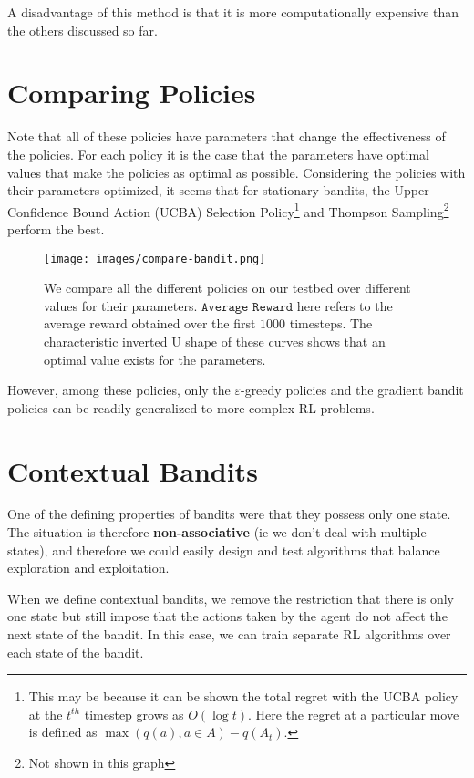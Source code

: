 \documentclass[12pt]{report}
\begin{document}
A disadvantage of this method is that it is more computationally expensive than the others discussed so far.

\section{Comparing Policies}
Note that all of these policies have parameters that change the effectiveness of the policies. For each policy it is the case that the parameters have optimal values that make the policies as optimal as possible.
Considering the policies with their parameters optimized, it seems that for stationary bandits, the Upper Confidence Bound Action (UCBA) Selection Policy\footnote{This may be because it can be shown the total regret with the UCBA policy at the $t^{th}$ timestep grows as $O(\log t)$. Here the regret at a particular move is defined as $\max(q(a), a \in A) - q(A_{t})$.} and Thompson Sampling\footnote{Not shown in this graph} perform the best. 

\begin{figure}[h!]
    \centering
    \texttt{[image: images/compare-bandit.png]}
    \caption{We compare all the different policies on our testbed over different values for their parameters. $\texttt{Average Reward}$ here refers to the average reward obtained over the first $1000$ timesteps. The characteristic inverted U shape of these curves shows that an optimal value exists for the parameters.}
\end{figure}

However, among these policies, only the $\varepsilon$-greedy policies and the gradient bandit policies can be readily generalized to more complex RL problems.

\section{Contextual Bandits}
One of the defining properties of bandits were that they possess only one state. The situation is therefore \textbf{non-associative} (ie we don't deal with multiple states), and therefore we could easily design 
and test algorithms that balance exploration and exploitation.

When we define contextual bandits, we remove the restriction that there is only one state but still impose that the actions taken by the agent do not affect the next state of the bandit. In this case, we can train separate RL algorithms 
over each state of the bandit.
\end{document}
